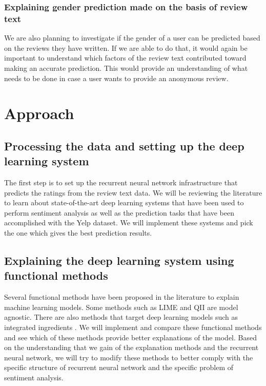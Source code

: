 \documentclass[11pt]{article}
\begin{document}
\subsubsection{Explaining gender prediction made on the basis of review text}

We are also planning to investigate if the gender of a user can be predicted based on the reviews they have written. If we are able to do that, it would again be important to understand which factors of the review text contributed toward making an accurate prediction. This would provide an understanding of what needs to be done in case a user wants to provide an anonymous review.

\section{Approach}

\subsection{Processing the data and setting up the deep learning system}
\label{step:rating-prediction}

The first step is to set up the recurrent neural network infrastructure \cite{Tang2015} that predicts the ratings from the review text data. We will be reviewing the literature to learn about state-of-the-art deep learning systems that have been used to perform sentiment analysis as well as the prediction tasks that have been accomplished with the Yelp dataset. We will implement these systems and pick the one which gives the best prediction results.

\subsection{Explaining the deep learning system using functional methods}
\label{step:rating-prediction-explanation}

Several functional methods have been proposed in the literature to explain machine learning models. Some methods such as LIME \cite{Ribeiro2016} and QII \cite{Datta2017} are model agnostic. There are also methods that target deep learning models such as integrated ingredients \cite{Sundararajan2017}. We will implement and compare these functional methods and see which of these methods provide better explanations of the model. Based on the understanding that we gain of the explanation methods and the recurrent neural network, we will try to modify these methods to better comply with the specific structure of recurrent neural network and the specific problem of sentiment analysis.
\end{document}
